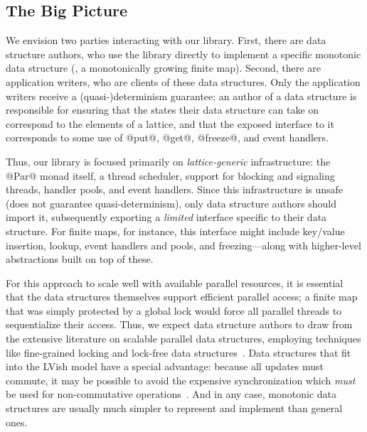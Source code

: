 
\subsection{The Big Picture}

We envision two parties interacting with our library.  First, there are data
structure authors, who use the library directly to implement a specific
monotonic data structure (\eg, a monotonically growing finite map).  Second,
there are application writers, who are clients of these data structures.  Only
the application writers receive a \mbox{(quasi-)determinism} guarantee; an author of a
data structure is responsible for ensuring that the states their data structure can take on
correspond to the elements of a lattice, and that the exposed interface to it corresponds to
some use of @put@, @get@, @freeze@, and event handlers.

Thus, our library is focused primarily on \emph{lattice-generic} infrastructure:
the @Par@ monad itself, a thread scheduler, support for blocking and signaling
threads, handler pools, and event handlers.  Since this infrastructure is unsafe
(does not guarantee quasi-determinism), only data structure authors should
import it, subsequently exporting a \emph{limited} interface specific to their
data structure.  For finite maps, for instance, this interface might include key/value
insertion, lookup, event handlers and pools, and freezing---along with
higher-level abstractions built on top of these.

For this approach to scale well with available parallel resources, it is
essential that the data structures themselves support efficient parallel access;
a finite map that was simply protected by a global lock would force all parallel
threads to sequentialize their access.  Thus, we expect data structure authors
to draw from the extensive literature on scalable parallel data structures,
employing techniques like fine-grained locking and lock-free data
structures~\cite{art}.  Data structures that fit into the LVish model have a
special advantage: because all updates must commute, it may be possible to avoid
the expensive synchronization which \emph{must} be used for non-commutative
operations~\cite{lawsOfOrder}.  And in any case, monotonic data structures are usually
much simpler to represent and implement than general ones.

